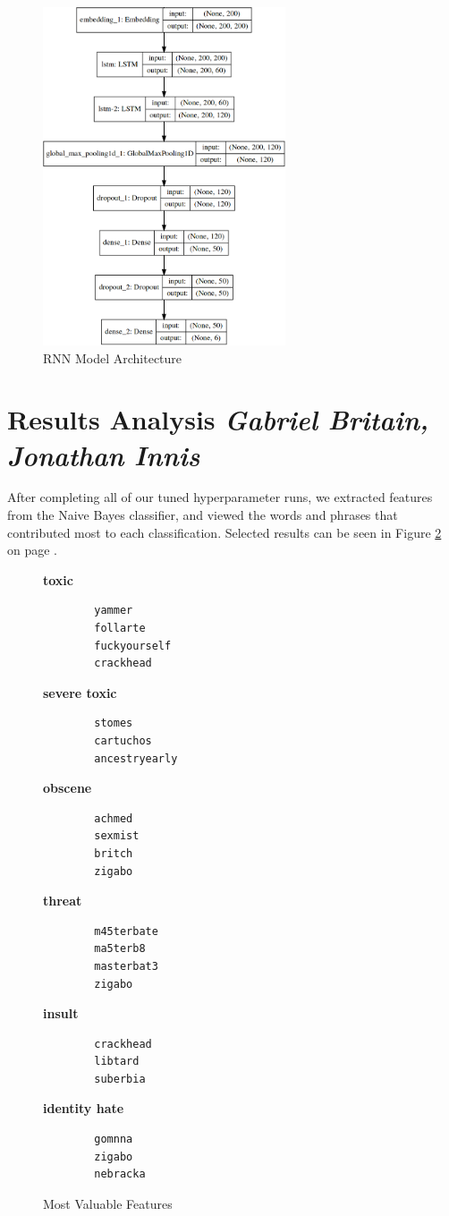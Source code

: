 \documentclass{article}
\begin{document}
{{	  \begin{figure}[h]
		  \centering
		  \includegraphics[height=10cm]{model-architecture.png}
		  \caption{RNN Model Architecture}
		  \label{fig:model-arch}
	  \end{figure}
  }
 }

\section{Results Analysis \textit{Gabriel Britain, Jonathan Innis}}{
  After completing all of our tuned hyperparameter runs, we extracted features
  from the Naive Bayes classifier, and viewed the words and phrases that
  contributed most to each classification. Selected results can be seen in
  Figure \ref{fig:features} on page \pageref{fig:features}.

  \begin{figure}
	  \textbf{toxic}
	  \begin{verbatim}
		yammer
		follarte
		fuckyourself
		crackhead
	\end{verbatim}
	  \textbf{severe toxic}
	  \begin{verbatim}
		stomes
		cartuchos
		ancestryearly
	\end{verbatim}
	  \textbf{obscene}
	  \begin{verbatim}
		achmed
		sexmist
		britch
		zigabo
	\end{verbatim}
	  \textbf{threat}
	  \begin{verbatim}
		m45terbate
		ma5terb8
		masterbat3
		zigabo
	\end{verbatim}
	  \textbf{insult}
	  \begin{verbatim}
		crackhead
		libtard
		suberbia
	\end{verbatim}
	  \textbf{identity hate}
	  \begin{verbatim}
		gomnna
		zigabo
		nebracka
	\end{verbatim}
	  \caption{Most Valuable Features}
	  \label{fig:features}
  \end{figure}

 }
\end{document}
